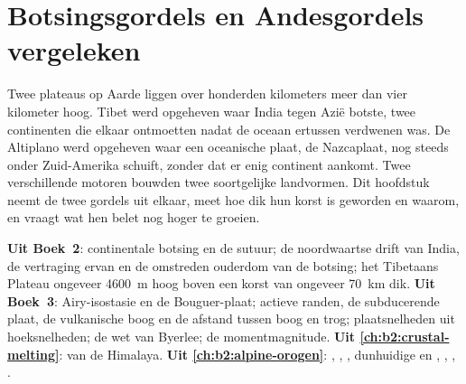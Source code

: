 \chapter{Botsingsgordels en Andesgordels vergeleken}\label{ch:b2:himalaya-andes}

Twee plateaus op Aarde liggen over honderden kilometers meer dan vier kilometer hoog.
Tibet werd opgeheven waar India tegen Azië botste, twee continenten die elkaar ontmoetten nadat de oceaan ertussen
verdwenen was. De Altiplano werd opgeheven waar een oceanische plaat, de Nazcaplaat, nog steeds
onder Zuid-Amerika schuift, zonder dat er enig continent aankomt. Twee verschillende motoren bouwden twee
soortgelijke landvormen. Dit hoofdstuk neemt de twee gordels uit elkaar, meet hoe dik hun korst
is geworden en waarom, en vraagt wat hen belet nog hoger te groeien.

\begin{recall}
\textbf{Uit Boek~2}: continentale botsing en de sutuur; de noordwaartse
drift van India, de vertraging ervan en de omstreden ouderdom van de botsing; het Tibetaans Plateau ongeveer
\qty{4600}{m} hoog boven een korst van ongeveer \qty{70}{km} dik. \textbf{Uit Boek~3}:
Airy-isostasie en de Bouguer-plaat; actieve randen, de subducerende plaat, de vulkanische boog en
de afstand tussen boog en trog; plaatsnelheden uit hoeksnelheden; de wet van Byerlee; de
momentmagnitude. \textbf{Uit \cref{ch:b2:crustal-melting}}:  van de Himalaya.
\textbf{Uit \cref{ch:b2:alpine-orogen}}: , , , dunhuidige en
, , , .
\end{recall}

